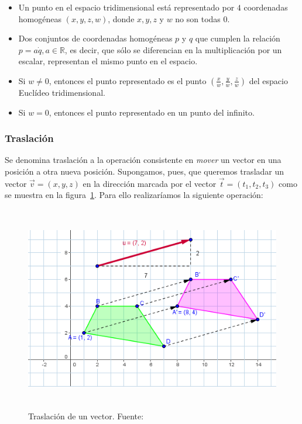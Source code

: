 \begin{itemize}

		\item Un punto en el espacio tridimensional está representado por $4$
				coordenadas homogéneas $(x,y,z,w)$, donde $x,y,z$ y $w$ no son
				todas $0$.

		\item Dos conjuntos de coordenadas homogéneas $p$ y $q$ que cumplen la
				relación $p = a \dot q, a \in \mathbb{R}$, es decir, que sólo se
				diferencian en la multiplicación por un escalar, representan el
				mismo punto en el espacio.

		\item Si $w \neq 0$, entonces el punto representado es el punto
				$(\frac{x}{w},\frac{y}{w},\frac{z}{w})$ del espacio Euclídeo
				tridimensional.

		\item Si $w = 0$, entonces el punto representado en un punto del
				infinito.

\end{itemize}

\subsubsection{Traslación}
\label{makereference5.4.1.1}

Se denomina traslación a la operación consistente en \textit{mover} un vector en
una posición a otra nueva posición. Supongamos, pues, que queremos trasladar un
vector $\overrightarrow{v} = (x,y,z)$ en la dirección marcada por el vector
$\overrightarrow{t} = (t_1, t_2, t_3)$ como se muestra en la
figura~\ref{fig:traslation}. Para ello realizaríamos la siguiente operación:

\begin{figure}
	\centering	
	\includegraphics[height=9cm]{figures/traslacion.png}
	\caption[Traslación de un vector.]{Traslación de un vector.
	Fuente:~\cite{vectortraslationimage}}
	\label{fig:traslation}
\end{figure}

